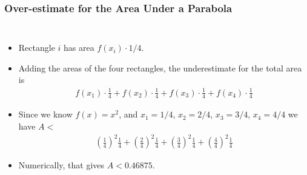 \documentclass[serif,ignorenonframetext]{beamer}
\begin{document}
\begin{frame}
  \frametitle{Over-estimate for the Area Under a Parabola}
  \begin{columns}
  \begin{itemize}[<+->]
  \item Rectangle $i$ has area $f(x_{i})\cdot 1/4$.
  \item Adding the areas of the four rectangles, 
    the underestimate for the total area is
    \begin{align*}
      f(x_1)\cdot\frac{1}{4}
      + f(x_2)\cdot\frac{1}{4}
      + f(x_3)\cdot\frac{1}{4}
      + f(x_4)\cdot\frac{1}{4}
    \end{align*}
  \item Since we know $f(x)=x^2$, and $x_1=1/4$, $x_2=2/4$,
    $x_3=3/4$, $x_4=4/4$ we have $A<$
    \begin{align*}
      \left(\frac{1}{4}\right)^2\frac{1}{4}
      + \left(\frac{2}{4}\right)^2\frac{1}{4}
      + \left(\frac{3}{4}\right)^2\frac{1}{4}
      + \left(\frac{4}{4}\right)^2\frac{1}{4}
    \end{align*}
  \item Numerically, that gives $A<0.46875$.  
  \end{itemize}
  \end{columns}
\end{frame}
\end{document}
